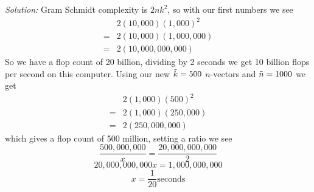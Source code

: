 \documentclass{article}
\newenvironment{solution}
    {\textit{Solution:}}
    {}
\begin{document}
\begin{solution}
Gram Schmidt complexity is $2nk^2$, so with our first numbers we see 
\begin{align*}
    &2(10,000)(1,000)^2 \\
    = &2(10,000)(1,000,000)\\
    = &2(10,000,000,000)
\end{align*}
So we have a flop count of 20 billion, dividing by 2 seconds we get 10 billion flops per second on this computer. Using our new $\Tilde{k} = 500$ $n$-vectors and $\Tilde{n} = 1000$ we get 
\begin{align*}
    &2(1,000)(500)^2 \\
    = &2(1,000)(250,000)\\
    = &2(250,000,000)
\end{align*}
which gives a flop count of 500 million, setting a ratio we see
$$\frac{500,000,000}{x} = \frac{20,000,000,000}{2}$$
$$20,000,000,000x = 1,000,000,000$$
$$\boxed{x=\frac{1}{20}}\text{seconds}$$
\end{solution}
\end{document}
